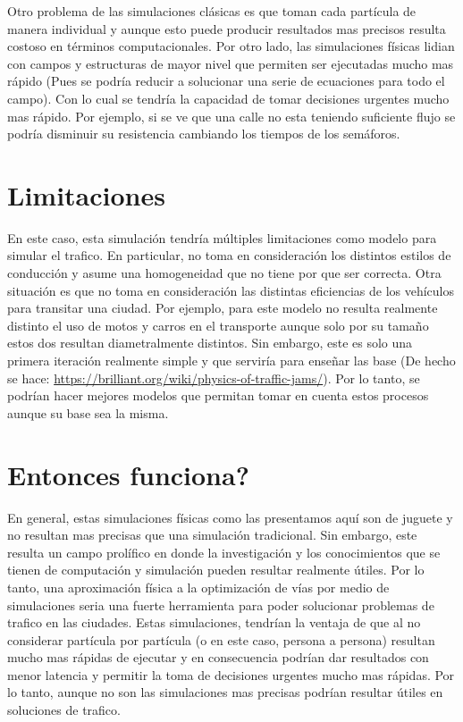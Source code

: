 \documentclass[12pt]{exam}
\begin{document}
Otro problema de las simulaciones clásicas es que toman cada partícula de manera individual y aunque esto puede producir resultados mas precisos resulta costoso en términos computacionales. Por otro lado, las simulaciones físicas lidian con campos y estructuras de mayor nivel que permiten ser ejecutadas mucho mas rápido (Pues se podría reducir a solucionar una serie de ecuaciones para todo el campo). Con lo cual se tendría la capacidad de tomar decisiones urgentes mucho mas rápido. Por ejemplo, si se ve que una calle no esta teniendo suficiente flujo se podría disminuir su resistencia cambiando los tiempos de los semáforos.

\section{Limitaciones}

En este caso, esta simulación tendría múltiples limitaciones como modelo para simular el trafico. En particular, no toma en consideración los distintos estilos de conducción y asume una homogeneidad que no tiene por que ser correcta. Otra situación es que no toma en consideración las distintas eficiencias de los vehículos para transitar una ciudad. Por ejemplo, para este modelo no resulta realmente distinto el uso de motos y carros en el transporte aunque solo por su tamaño estos dos resultan diametralmente distintos. Sin embargo, este es solo una primera iteración realmente simple y que serviría para enseñar las base (De hecho se hace: \url{https://brilliant.org/wiki/physics-of-traffic-jams/}). Por lo tanto, se podrían hacer mejores modelos que permitan tomar en cuenta estos procesos aunque su base sea la misma. 

\section{Entonces funciona?}

En general, estas simulaciones físicas como las presentamos aquí son de juguete y no resultan mas precisas que una simulación tradicional. Sin embargo, este resulta un campo prolífico en donde la investigación y los conocimientos que se tienen de computación y simulación pueden resultar realmente útiles. Por lo tanto, una aproximación física a la optimización de vías por medio de simulaciones seria una fuerte herramienta para poder solucionar problemas de trafico en las ciudades. Estas simulaciones, tendrían la ventaja de que al no considerar partícula por partícula (o en este caso, persona a persona) resultan mucho mas rápidas de ejecutar y en consecuencia podrían dar resultados con menor latencia y permitir la toma de decisiones urgentes mucho mas rápidas. Por lo tanto, aunque no son las simulaciones mas precisas podrían resultar útiles en soluciones de trafico.


\printbibliography
\end{document}
